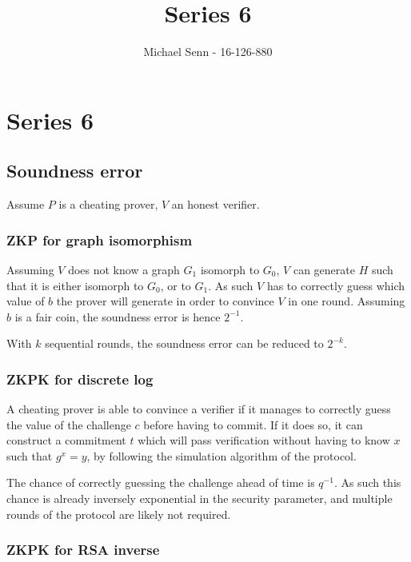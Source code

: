 \documentclass[a4paper]{scrreprt}
\title{Series 6}
\author{Michael Senn \maillink{michael.senn@students.unibe.ch} - 16-126-880}
\date{\printdate}
\begin{document}
\maketitle


\setcounter{chapter}{5}

\chapter{Series 6}

\section{Soundness error}

Assume $P$ is a cheating prover, $V$ an honest verifier.

\subsection{ZKP for graph isomorphism}

Assuming $V$ does not know a graph $G_1$ isomorph to $G_0$, $V$ can generate
$H$ such that it is either isomorph to $G_0$, or to $G_1$. As such $V$ has to
correctly guess which value of $b$ the prover will generate in order to
convince $V$ in one round. Assuming $b$ is a fair coin, the soundness error is
hence $2^{-1}$.

With $k$ sequential rounds, the soundness error can be reduced to $2^{-k}$.

\subsection{ZKPK for discrete log}

A cheating prover is able to convince a verifier if it manages to correctly
guess the value of the challenge $c$ before having to commit. If it does so, it
can construct a commitment $t$ which will pass verification without having to
know $x$ such that $g^x = y$, by following the simulation algorithm of the
protocol.

The chance of correctly guessing the challenge ahead of time is $q^{-1}$. As
such this chance is already inversely exponential in the security parameter,
and multiple rounds of the protocol are likely not required.

\subsection{ZKPK for RSA inverse}
\end{document}
